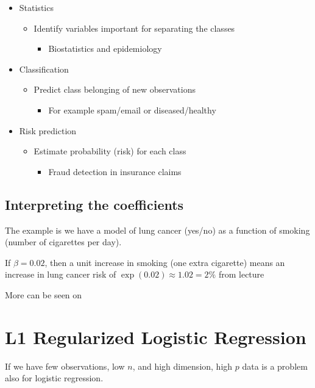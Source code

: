 \begin{itemize}
  \item Statistics
  \begin{itemize}
    \item Identify variables important for separating the classes
    \begin{itemize}
      \item Biostatistics and epidemiology
    \end{itemize}
  \end{itemize}
  \item Classification
  \begin{itemize}
    \item Predict class belonging of new observations
    \begin{itemize}
      \item For example spam/email or diseased/healthy
    \end{itemize}
  \end{itemize}
  \item Risk prediction
  \begin{itemize}
    \item Estimate probability (risk) for each class
    \begin{itemize}
      \item Fraud detection in insurance claims
    \end{itemize}
  \end{itemize}
\end{itemize}

\subsection{Interpreting the coefficients}

The example is we have a model of lung cancer (yes/no) as a function of smoking (number of cigarettes per day).

If $\beta = 0.02$, then a unit increase in smoking (one extra cigarette) means an increase in lung cancer risk of $\exp(0.02) \approx 1.02 = 2\%$ from lecture \cite[p.~30]{lecture4}

More can be seen on \cite[p.~124]{friedman2016elements}

\section{L1 Regularized Logistic Regression}

If we have few observations, low $n$, and high dimension, high $p$ data is a problem also for logistic regression.

